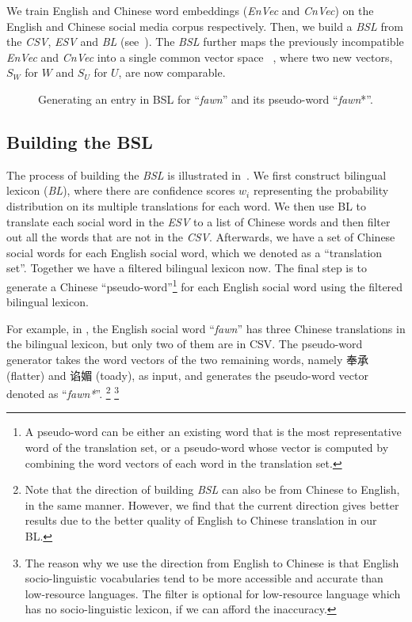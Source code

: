 We train English and 
Chinese word embeddings (\textit{EnVec} and \textit{CnVec}) 
on the English and Chinese social media corpus respectively. 
Then, 
we build a \textit{BSL}
from the \textit{CSV}, \textit{ESV} and \textit{BL} (see~). 
The \textit{BSL} further maps the previously incompatible \textit{EnVec} and \textit{CnVec} 
into a single common vector space \textit{\socvec~},
where two new vectors, $S_W$ for $W$ and $S_U$ for $U$,
are now comparable.
%

\begin{figure*}[h]
	\centering
	\vspace{-15pt}
	\caption{Generating an entry in BSL for ``\textit{fawn}'' 
		and its pseudo-word ``\textit{fawn}*''.}
	\label{fig:BSL}
	\vspace{-15pt}
\end{figure*}
\subsection{Building the {BSL}}
\label{sec:bsl}
The process of building the \textit{BSL} is 
illustrated in~. 
We first construct bilingual lexicon (\textit{BL}), where there are confidence scores $w_i$ representing the probability distribution on its multiple translations for each word. We then use BL to translate each social word 
in the \textit{ESV} to a list of Chinese words and then filter out all the words 
that are not in the \textit{CSV}. 
Afterwards, we have a set of 
Chinese social words for each English social word, which we denoted as a ``translation set''. Together we have a filtered bilingual lexicon now.
The final step is to generate a Chinese ``pseudo-word''\footnote{A pseudo-word can be either 
	an existing word that is the most representative word of the translation set, or a pseudo-word whose vector is computed by combining the word vectors of
	each word in the translation set.}
for each English social word using the filtered bilingual lexicon.

For example, in , the
English social word ``\textit{fawn}'' has three Chinese translations in the 
bilingual lexicon, but only two of them are in CSV. 
The pseudo-word generator takes the word vectors of the two remaining words, namely
奉承 (flatter) and 谄媚 (toady), as input, and generates the pseudo-word 
vector denoted as ``\textit{fawn*}''. \footnote{Note that the direction of building \textit{BSL} can also be from Chinese to English, 
	in the same manner. However, we find that the current direction 
		gives better results due to the better quality of English to Chinese translation in our BL.}
\footnote{The reason why we use the direction from English to Chinese  is that English socio-linguistic vocabularies tend to be more accessible and accurate than low-resource languages. The filter is optional for low-resource language which has no socio-linguistic lexicon, if we can afford the inaccuracy.}

